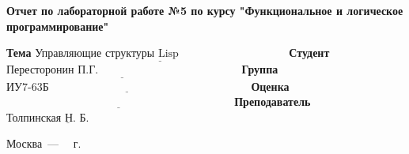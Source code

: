 \begin{titlepage}
    \begin{center}
        \Large\textbf{Отчет по лабораторной работе №5 по курсу "Функциональное и логическое программирование"}
    \end{center}

    \noindent\textbf{Тема} $\underline{\text{Управляющие структуры Lisp~~~~~~~~~~~~~~~~~~~~~~~~~~~~~}}$\newline\newline\newline
    \noindent\textbf{Студент} $\underline{\text{Пересторонин П.Г.~~~~~~~~~~~~~~~~~~~~~~~~~~~~~~~~~~~~~~}}$\newline\newline
    \noindent\textbf{Группа} $\underline{\text{ИУ7-63Б~~~~~~~~~~~~~~~~~~~~~~~~~~~~~~~~~~~~~~~~~~~~~~~~~~~~~~}}$\newline\newline
    \noindent\textbf{Оценка} $\underline{\text{~~~~~~~~~~~~~~~~~~~~~~~~~~~~~~~~~~~~~~~~~~~~~~~~~~~~~~~~~~~~~}}$\newline\newline
    \noindent\textbf{Преподаватель} $\underline{\text{Толпинская Н. Б.~~~~~~~~~~~}}$\newline

    \begin{center}
        \vfill
        Москва~---~\the\year
        ~г.
    \end{center}
    \restoregeometry
\end{titlepage}
